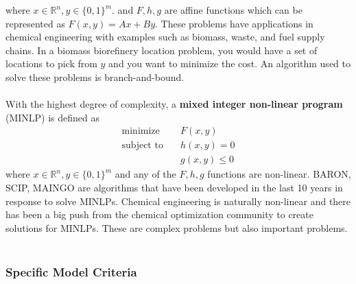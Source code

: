 where $x \in \mathbb{R}^n, y \in \{ 0,1 \}^m$. and $F,h,g$ are affine functions which can be represented as $F(x,y) = Ax + By$. These problems have applications in chemical engineering with examples such as biomass, waste, and fuel supply chains.  In a biomass biorefinery location problem, you would have a set of locations to pick from $y$ and you want to minimize the cost. An algorithm used to solve these problems is branch-and-bound. \\ \\
With the highest degree of complexity, a \textbf{mixed integer non-linear program} (MINLP) is defined as
\begin{align}
    \text{minimize} & \quad F(x,y) \\
    \text{subject to} & \quad h(x,y) = 0 \\
    & \quad g(x,y) \leq 0
\end{align}
where $x \in \mathbb{R}^n, y \in \{ 0,1 \}^m$ and any of the $F,h,g$ functions are non-linear. BARON, SCIP, MAINGO are algorithms that have been developed in the last 10 years in response to solve MINLPs. Chemical engineering is naturally non-linear and there has been a big push from the chemical optimization community to create solutions for MINLPs. These are complex problems but also important problems. \\ \\

\subsubsection{Specific Model Criteria}

